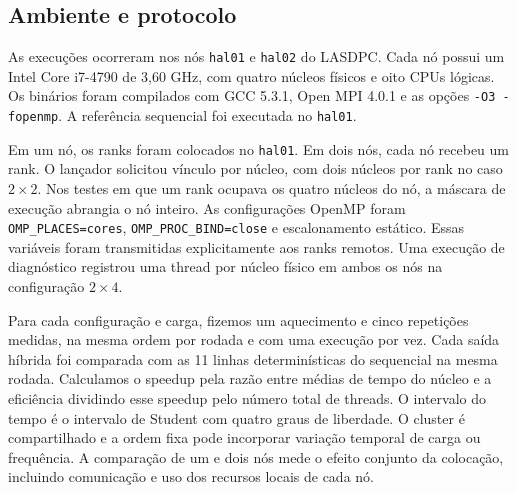 \subsection{Ambiente e protocolo}

As execuções ocorreram nos nós \texttt{hal01} e \texttt{hal02} do LASDPC.
Cada nó possui um Intel Core i7-4790 de 3,60 GHz, com quatro núcleos físicos
e oito CPUs lógicas. Os binários foram compilados com GCC 5.3.1,
Open MPI 4.0.1 e as opções \texttt{-O3 -fopenmp}. A referência sequencial
foi executada no \texttt{hal01}.

Em um nó, os ranks foram colocados no \texttt{hal01}. Em dois nós,
cada nó recebeu um rank. O lançador solicitou vínculo por núcleo,
com dois núcleos por rank no caso $2\times2$. Nos testes em que
um rank ocupava os quatro núcleos do nó, a máscara de execução
abrangia o nó inteiro. As configurações OpenMP foram
\texttt{OMP\_PLACES=cores}, \texttt{OMP\_PROC\_BIND=close} e
escalonamento estático. Essas variáveis foram transmitidas explicitamente
aos ranks remotos. Uma execução de diagnóstico registrou uma thread por
núcleo físico em ambos os nós na configuração $2\times4$.

Para cada configuração e carga, fizemos um aquecimento e cinco
repetições medidas, na mesma ordem por rodada e com uma execução
por vez. Cada saída híbrida foi comparada com as 11 linhas
determinísticas do sequencial na mesma rodada. Calculamos o
speedup pela razão entre médias de tempo do núcleo e a eficiência
dividindo esse speedup pelo número total de threads. O intervalo
do tempo é o intervalo de Student com quatro graus de liberdade.
O cluster é compartilhado e a ordem fixa pode incorporar variação
temporal de carga ou frequência. A comparação de um e dois nós
mede o efeito conjunto da colocação, incluindo comunicação e
uso dos recursos locais de cada nó.
